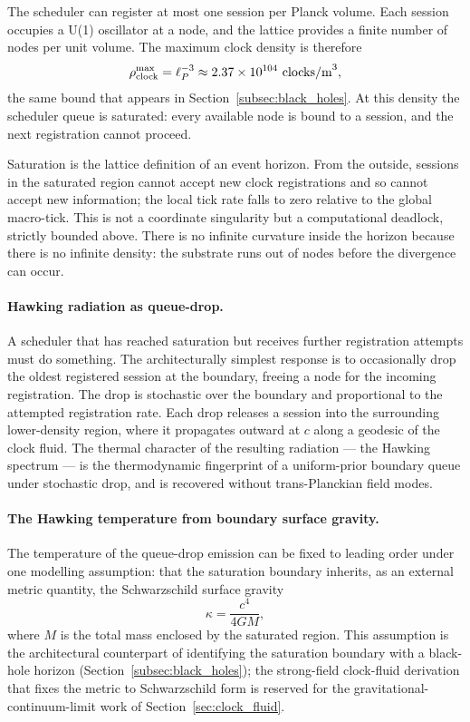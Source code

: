 The scheduler can register at most one session per Planck volume.
Each session occupies a U(1) oscillator at a node, and the lattice
provides a finite number of nodes per unit volume.
The maximum clock density is therefore
\begin{equation}
    \rho_{\mathrm{clock}}^\text{max} = \ell_P^{-3}
        \approx 2.37 \times 10^{104}\ \text{clocks/m}^3,
    \label{eq:rho_max_scheduler}
\end{equation}
the same bound that appears in Section~\ref{subsec:black_holes}.
At this density the scheduler queue is saturated: every available node
is bound to a session, and the next registration cannot proceed.

Saturation is the lattice definition of an event horizon.
From the outside, sessions in the saturated region cannot accept new
clock registrations and so cannot accept new information; the local
tick rate falls to zero relative to the global macro-tick.
This is not a coordinate singularity but a computational deadlock,
strictly bounded above.
There is no infinite curvature inside the horizon because there is no
infinite density: the substrate runs out of nodes before the divergence
can occur.

\paragraph{Hawking radiation as queue-drop.}
A scheduler that has reached saturation but receives further
registration attempts must do something.
The architecturally simplest response is to occasionally drop the
oldest registered session at the boundary, freeing a node for the
incoming registration.
The drop is stochastic over the boundary and proportional to the
attempted registration rate.
Each drop releases a session into the surrounding lower-density region,
where it propagates outward at $c$ along a geodesic of the clock fluid.
The thermal character of the resulting radiation --- the Hawking
spectrum --- is the thermodynamic fingerprint of a uniform-prior
boundary queue under stochastic drop, and is recovered without
trans-Planckian field modes.

\paragraph{The Hawking temperature from boundary surface gravity.}
The temperature of the queue-drop emission can be fixed to leading
order under one modelling assumption: that the saturation boundary
inherits, as an external metric quantity, the Schwarzschild surface
gravity
\begin{equation}
    \kappa = \frac{c^4}{4 G M},
    \label{eq:surface_gravity}
\end{equation}
where $M$ is the total mass enclosed by the saturated region.
This assumption is the architectural counterpart of identifying the
saturation boundary with a black-hole horizon
(Section~\ref{subsec:black_holes}); the strong-field clock-fluid
derivation that fixes the metric to Schwarzschild form is reserved
for the gravitational-continuum-limit work of
Section~\ref{sec:clock_fluid}.

